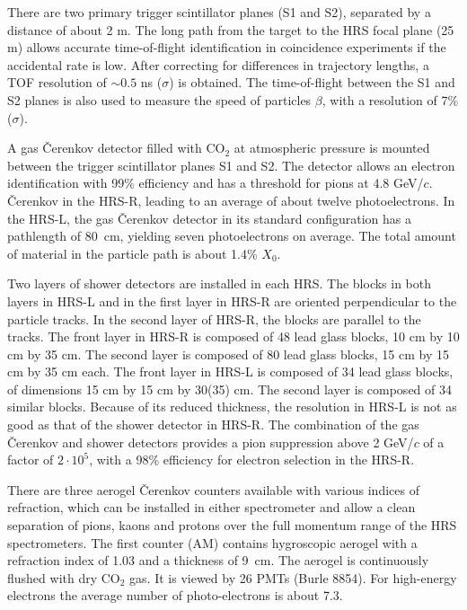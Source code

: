 There are two primary trigger scintillator planes (S1 and S2), 
separated by a distance of about 2 m. 
The long path from the target to the HRS focal plane (25 m) allows 
accurate time-of-flight identification in coincidence experiments 
if the accidental rate is low. 
After correcting for differences in trajectory lengths, 
a TOF resolution of $\sim 0.5$ ns ($\sigma$) is obtained. 
The time-of-flight between the S1 and S2 planes is also 
used to measure the speed of particles $\beta$, with a resolution of 7\% ($\sigma$).

A gas \v{C}erenkov detector filled  with CO$_{2}$ at atmospheric 
pressure is mounted between the trigger scintillator planes S1 and S2. 
The detector allows an electron identification  with 99\% efficiency
and has a threshold for pions at 4.8 GeV/$c$. 
\v{C}erenkov in the HRS-R, leading to an average of about twelve photoelectrons. 
In the HRS-L, the gas \v{C}erenkov detector in its standard configuration has 
a pathlength of 80~cm, yielding seven photoelectrons on average. 
The total amount of material in the particle path is about 1.4\% $X_0$. 

Two layers of shower detectors are installed in each HRS. 
The blocks in both layers in HRS-L and in the first 
layer in HRS-R are oriented perpendicular to the particle tracks. In 
the second layer of HRS-R, the blocks are parallel to the tracks. The front 
layer in HRS-R is composed of 48 lead glass blocks, 
10 cm by 10 cm by 35 cm. The second layer is composed of 80 
lead glass blocks, 15 cm by 15 cm by 35 cm each.  
The front layer in HRS-L is composed of 34 lead glass blocks, of 
dimensions 15 cm by 15 cm by 30(35) cm. The second layer is  composed 
of 34 similar blocks. Because of its reduced thickness, the resolution in 
HRS-L is not as good as that of the shower detector in HRS-R.
The combination of the gas \v{C}erenkov and shower detectors provides a 
pion suppression above 2 GeV/$c$ of  a factor of $2 \cdot 10^{5}$, with a 
98\% efficiency for electron selection in the HRS-R. 

There are  three aerogel \v{C}erenkov counters available with various indices
of refraction, which can be installed in either spectrometer and allow 
a clean separation of pions, kaons and protons over the full momentum 
range of the HRS spectrometers.
The first counter (AM) contains hygroscopic aerogel  
with a refraction index of 1.03 and a thickness of 9~cm. The 
aerogel is continuously flushed with dry CO$_{2}$ gas.  It is viewed 
by 26 PMTs (Burle 8854). For high-energy electrons the average 
number of photo-electrons is about 7.3. 

